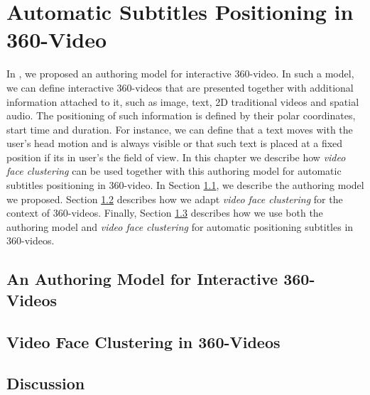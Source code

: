 \newpage
\chapter{Automatic Subtitles Positioning in 360-Video}
\label{chap:subtitles_positioning}

In \cite{mendes2020authoring}, we proposed an authoring model for interactive 360-video. In such a model, we can define interactive 360-videos that are presented together with additional information attached to it, such as image, text, 2D traditional videos and spatial audio. The positioning of such information is defined by their polar coordinates, start time and duration. For instance, we can define that a text moves with the user's head motion and is always visible or that such text is placed at a fixed position if its in user's the field of view. In this chapter we describe how \emph{video face clustering} can be used together with this authoring model for automatic subtitles positioning in 360-video. In Section \ref{sec:authoring_model}, we describe the authoring model we proposed. Section \ref{sec:authoring_clustering_360} describes how we adapt \emph{video face clustering} for the context of 360-videos. Finally, Section \ref{sec:authoring_discussion} describes how we use both the authoring model and \emph{video face clustering} for automatic positioning subtitles in 360-videos.

\section{An Authoring Model for Interactive 360-Videos}
\label{sec:authoring_model}

\section{Video Face Clustering in 360-Videos}
\label{sec:authoring_clustering_360}

\section{Discussion}
\label{sec:authoring_discussion}